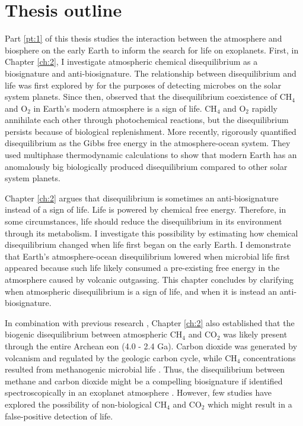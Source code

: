 \section{Thesis outline}

Part \ref{pt:1} of this thesis studies the interaction between the atmosphere and biosphere on the early Earth to inform the search for life on exoplanets. First, in Chapter \ref{ch:2}, I investigate atmospheric chemical disequilibrium as a biosignature and anti-biosignature. The relationship between disequilibrium and life was first explored by \citet{Lovelock_1965} for the purposes of detecting microbes on the solar system planets. Since then, \citet{Sagan_1993} observed that the disequilibrium coexistence of CH$_4$ and O$_2$ in Earth's modern atmosphere is a sign of life. CH$_4$ and O$_2$ rapidly annihilate each other through photochemical reactions, but the disequilibrium persists because of biological replenishment. More recently, \citet{KrissansenTotton_2016} rigorously quantified disequilibrium as the Gibbs free energy in the atmosphere-ocean system. They used multiphase thermodynamic calculations to show that modern Earth has an anomalously big biologically produced disequilibrium compared to other solar system planets.

Chapter \ref{ch:2} argues that disequilibrium is sometimes an anti-biosignature instead of a sign of life. Life is powered by chemical free energy. Therefore, in some circumstances, life should reduce the disequilibrium in its environment through its metabolism. I investigate this possibility by estimating how chemical disequilibrium changed when life first began on the early Earth. I demonstrate that Earth's atmosphere-ocean disequilibrium lowered when microbial life first appeared because such life likely consumed a pre-existing free energy in the atmosphere caused by volcanic outgassing. This chapter concludes by clarifying when atmospheric disequilibrium is a sign of life, and when it is instead an anti-biosignature.

In combination with previous research \citep{KrissansenTotton_2018_diseq}, Chapter \ref{ch:2} also established that the biogenic disequilibrium between atmospheric CH$_4$ and CO$_2$ was likely present through the entire Archean eon (4.0 - 2.4 Ga). Carbon dioxide was generated by volcanism and regulated by the geologic carbon cycle, while CH$_4$ concentrations resulted from methanogenic microbial life \citep{Catling_2020}. Thus, the disequilibrium between methane and carbon dioxide might be a compelling biosignature if identified spectroscopically in an exoplanet atmosphere \citep{KrissansenTotton_2018_diseq}. However, few studies have explored the possibility of non-biological CH$_4$ and CO$_2$ which might result in a false-positive detection of life.


